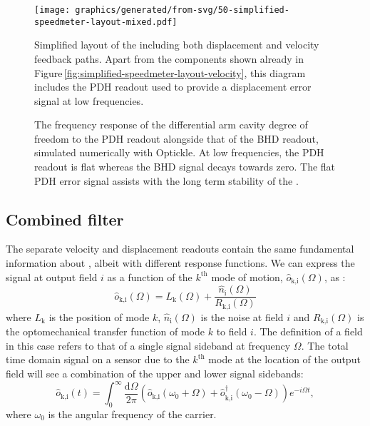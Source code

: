 \begin{figure}
  \centering
  \texttt{[image: graphics/generated/from-svg/50-simplified-speedmeter-layout-mixed.pdf]}
  \caption[Simplified layout of the \SSMEXPT{} including both displacement and velocity feedback paths]{\label{fig:simplified-speedmeter-layout-mixed}Simplified layout of the \SSMEXPT{} including both displacement and velocity feedback paths. Apart from the components shown already in Figure\,\ref{fig:simplified-speedmeter-layout-velocity}, this diagram includes the \gls{PDH} readout used to provide a displacement error signal at low frequencies.}
\end{figure}

\begin{figure}
  \centering
  
  \caption[The frequency response of the differential arm cavity degree of freedom to the Pound-Drever-Hall readout]{\label{fig:pdh-response}The frequency response of the differential arm cavity degree of freedom to the \gls{PDH} readout alongside that of the \gls{BHD} readout, simulated numerically with Optickle. At low frequencies, the \gls{PDH} readout is flat whereas the \gls{BHD} signal decays towards zero. The flat \gls{PDH} error signal assists with the long term stability of the \SSMEXPT{}.}
\end{figure}

\subsection{\label{sec:combined-filter}Combined filter}
The separate velocity and displacement readouts contain the same fundamental information about \LMINUS{}, albeit with different response functions. We can express the signal at output field $i$ as a function of the $k^{\textrm{th}}$ mode of motion, $\hat{o}_{\textrm{k,i}} \left( \Omega \right)$, as \cite{Kimble2001}:
\begin{equation}
  \label{eq:readout-signals}
  \hat{o}_{\textrm{k,i}} \left( \Omega \right) = L_{\textrm{k}}\left(\Omega\right) + \frac{\hat{n}_{\textrm{i}} \left( \Omega \right)}{R_{\textrm{k,i}} \left( \Omega \right)}
\end{equation}
where $L_{\textrm{k}}$ is the position of mode $k$, $\hat{n}_{\textrm{i}} \left( \Omega \right)$ is the noise at field $i$ and $R_{\textrm{k,i}} \left( \Omega \right)$ is the optomechanical transfer function of mode $k$ to field $i$. The definition of a field in this case refers to that of a single signal sideband at frequency $\Omega$. The total time domain signal on a sensor due to the $k^{\textrm{th}}$ mode at the location of the output field will see a combination of the upper and lower signal sidebands:
\begin{equation}
  \hat{o}_{\textrm{k,i}} \left( t \right) = \int_{0}^{\infty} \frac{\textrm{d} \Omega}{2 \pi} \left( \hat{o}_{\textrm{k,i}} \left( \omega_{0} + \Omega \right) + \hat{o}_{\textrm{k,i}}^\dag \left( \omega_{0} - \Omega \right) \right) e^{-i \Omega t},
\end{equation}
where $\omega_{0}$ is the angular frequency of the carrier.

